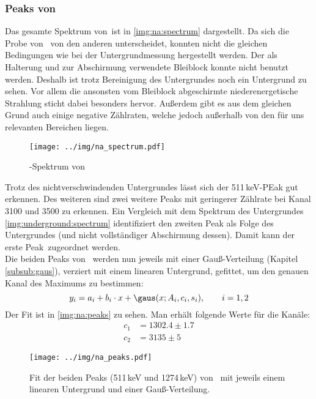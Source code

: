 \subsubsection{Peaks von \na}
\label{subsub:eval:na}
Das gesamte Spektrum von \na\,ist in \autoref{img:na:spectrum} dargestellt. Da sich die Probe von \na\, von den anderen unterscheidet, konnten nicht die 
gleichen Bedingungen wie bei der Untergrundmessung hergestellt werden. Der als Halterung und zur Abschirmung verwendete Bleiblock konnte nicht 
benutzt werden. Deshalb ist trotz Bereinigung des Untergrundes noch ein Untergrund zu sehen. Vor allem die ansonsten vom Bleiblock abgeschirmte 
niederenergetische Strahlung sticht dabei besonders hervor. Außerdem gibt es aus dem gleichen Grund auch einige negative Zählraten, welche jedoch 
außerhalb von den für uns relevanten Bereichen liegen.
\begin{figure}[H]
\begin{center}
  \texttt{[image: ../img/na\_spectrum.pdf]}
  \caption{\textgamma-Spektrum von }
  \label{img:na:spectrum}
\end{center}
\end{figure}
Trotz des nichtverschwindenden Untergrundes lässt sich der 511\,keV-PEak gut erkennen. Des weiteren sind zwei weitere Peaks mit geringerer 
Zählrate bei Kanal 3100 und 3500 zu erkennen. Ein Vergleich mit dem Spektrum des Untergrundes \autoref{img:underground:spectrum} identifiziert 
den zweiten Peak als Folge des Untergrundes (und nicht vollständiger Abschirmung dessen). Damit kann der erste Peak \na\,zugeordnet werden.\\[\baselineskip]
Die beiden Peaks von \na\, werden nun jeweils mit einer Gauß-Verteilung (Kapitel \ref{subsub:gaus}), verziert mit einem linearen Untergrund, 
gefittet, um den genauen Kanal des Maximums zu bestimmen:
\begin{equation}
  y_i = a_i + b_i \cdot x + \gaus(x; A_i, c_i, s_i), \qquad i = 1, 2
\end{equation}
Der Fit ist in \autoref{img:na:peaks} zu sehen. Man erhält folgende Werte für die Kanäle:
\begin{equation}
\begin{split}
  \label{eq:na:channels}
  c_1 &= 1302.4  \pm 1.7 \\
  c_2 &= 3135  \pm 5 
\end{split}
\end{equation}
\begin{figure}[H]
\begin{center}
  \texttt{[image: ../img/na\_peaks.pdf]}
  \caption{Fit der beiden Peaks (511\,keV und 1274\,keV) von \na\, mit jeweils einem linearen Untergrund und einer Gauß-Verteilung.}
  \label{img:na:peaks}
\end{center}
\end{figure}

